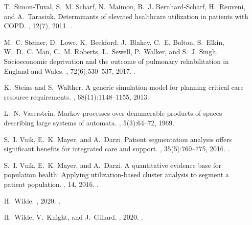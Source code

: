 \documentclass[11pt]{article}
\begin{document}
\begin{thebibliography}{10}
T.~Simon-Tuval, S.~M. Scharf, N.~Maimon, B.~J. Bernhard-Scharf, H.~Reuveni, and
  A.~Tarasiuk.
\newblock Determinants of elevated healthcare utilization in patients with
  {COPD}.
, 12(7), 2011.
\newblock \href {https://doi.org/10.1186/1465-9921-12-7}
  {}.

M.~C. Steiner, D.~Lowe, K.~Beckford, J.~Blakey, C.~E. Bolton, S.~Elkin,
  W.~D.~C. Man, C.~M. Roberts, L.~Sewell, P.~Walker, and S.~J. Singh.
\newblock Socioeconomic deprivation and the outcome of pulmonary rehabilitation
  in {England} and {Wales}.
, 72(6):530--537, 2017.
\newblock \href {https://doi.org/10.1136/thoraxjnl-2016-209376}
  {}.

K.~Steins and S.~Walther.
\newblock A generic simulation model for planning critical care resource
  requirements.
, 68(11):1148--1155, 2013.

L.~N. Vaserstein.
\newblock Markov processes over denumerable products of spaces describing large
  systems of automata.
, 5(3):64--72, 1969.

S.~I. Vuik, E.~K. Mayer, and A.~Darzi.
\newblock Patient segmentation analysis offers significant benefits for
  integrated care and support.
, 35(5):769--775, 2016.
\newblock \href {https://doi.org/10.1377/hlthaff.2015.1311}
  {}.

S.~I. Vuik, E.~K. Mayer, and A.~Darzi.
\newblock A quantitative evidence base for population health: Applying
  utilization-based cluster analysis to segment a patient population.
, 14, 2016.
\newblock \href {https://doi.org/10.1186/s12963-016-0115-z}
  {}.

H.~Wilde.
, 2020.
\newblock \href {https://doi.org/10.5281/zenodo.3937548}
  {}.

H.~Wilde, V.~Knight, and J.~Gillard.
, 2020.
\newblock \href {https://doi.org/10.5281/zenodo.3924716}
  {}.


\end{thebibliography}
\end{document}
